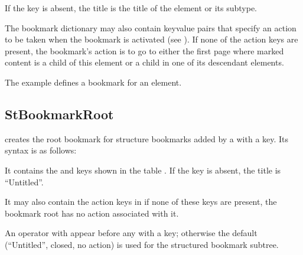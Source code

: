 \documentclass[letterpaper,12pt,english,openany,oneside]{sphinxmanual}
\begin{document}
If the  key is absent, the title is the title of the element or its subtype.

The bookmark dictionary may also contain key\sphinxhyphen{}value pairs that specify an action to be taken when the bookmark is activated (see ). If none of the action keys are present, the bookmark’s action is to go to either the first page where marked content is a child of this element or a child in one of its descendant elements.

The example  defines a bookmark for an element.


\subsection{StBookmarkRoot}
\label{\detokenize{pdfmark_Logical:stbookmarkroot}}
 creates the root bookmark for structure bookmarks added by a  with a  key. Its syntax is as follows:

\begin{sphinxVerbatim}[commandchars=\\\{\}]
 \PYG{p}{[} 
\PYG{p}{[} 
\PYG{p}{[}              \PYG{p}{[} 
         
\end{sphinxVerbatim}

It contains the  and  keys shown in the table . If the  key is absent, the title is “Untitled”.

It may also contain the action keys in  if none of these keys are present, the bookmark root has no action associated with it.

An operator with   appear before any  with a  key; otherwise the default (“Untitled”, closed, no action) is used for the structured bookmark subtree.
\end{document}
